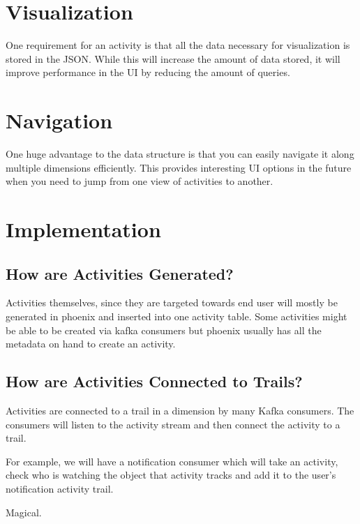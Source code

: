 \documentclass[11pt]{article}
\begin{document}
\section{Visualization}

One requirement for an activity is that all the data necessary for visualization is stored
in the JSON. While this will increase the amount of data stored, it will improve performance
in the UI by reducing the amount of queries. 

\section{Navigation}

One huge advantage to the data structure is that you can easily navigate it along multiple
dimensions efficiently. This provides interesting UI options in the future when you need
to jump from one view of activities to another.

\section{Implementation}

\subsection{How are Activities Generated?}

Activities themselves, since they are targeted towards end user will mostly be generated
in phoenix and inserted into one activity table. Some activities might be able to 
be created via kafka consumers but phoenix usually has all the metadata on hand
to create an activity.

\subsection{How are Activities Connected to Trails?}

Activities are connected to a trail in a dimension by many Kafka consumers. The consumers
will listen to the activity stream and then connect the activity to a trail.

For example, we will have a notification consumer which will take an activity, check who
is watching the object that activity tracks and add it to the user's notification activity trail.

Magical.
\end{document}
